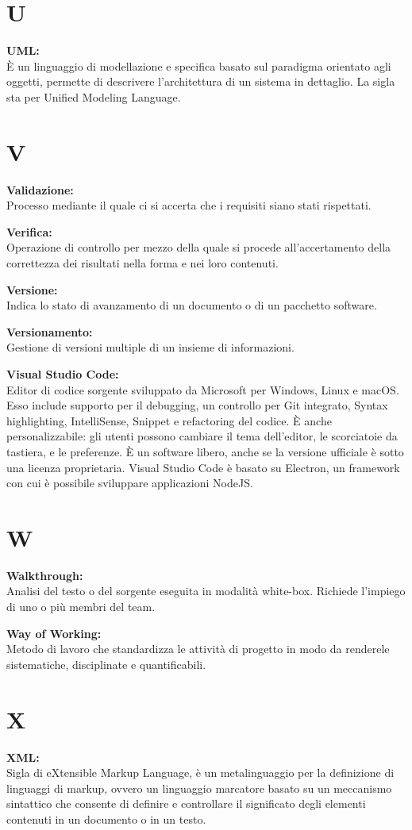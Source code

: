 \documentclass[a4paper, oneside, openany, dvipsnames, table]{article}
\begin{document}
\newpage 
\section{U}

\textbf{UML:}\\ \`E un linguaggio di modellazione e specifica basato sul paradigma orientato agli oggetti, permette di descrivere l'architettura di un sistema in dettaglio. La sigla sta per Unified Modeling Language.

\newpage
\section{V}
\textbf{Validazione:}\\	Processo mediante il quale ci si accerta che i requisiti siano stati rispettati.

\textbf{Verifica:}\\	Operazione di controllo per mezzo della quale si procede all'accertamento della correttezza dei risultati nella forma e nei loro contenuti.

\textbf{Versione:}\\ Indica lo stato di avanzamento di un documento o di un pacchetto software.

\textbf{Versionamento:}\\	Gestione di versioni multiple di un insieme di informazioni.

\textbf{Visual Studio Code:}\\	Editor di codice sorgente sviluppato da Microsoft per Windows, Linux e macOS. Esso include supporto per il debugging, un controllo per Git integrato, Syntax highlighting, IntelliSense, Snippet e refactoring del codice. È anche personalizzabile: gli utenti possono cambiare il tema dell'editor,  le scorciatoie da tastiera, e le preferenze. È un software libero, anche se la versione ufficiale è sotto una licenza proprietaria. Visual Studio Code è basato su Electron, un framework con cui è possibile sviluppare applicazioni NodeJS.


\newpage
\section{W}
\textbf{Walkthrough:}\\
Analisi del testo o del sorgente eseguita in modalità white-box. Richiede l'impiego di uno o più membri del team.

\textbf{Way of Working:}\\
Metodo di lavoro che standardizza le attività di progetto in modo da renderele sistematiche, disciplinate
e quantificabili.

\newpage
\section{X}
\textbf{XML:}\\
Sigla di eXtensible Markup Language, è un metalinguaggio per la definizione di linguaggi di markup, ovvero un linguaggio marcatore basato su un meccanismo sintattico che consente di definire e controllare il significato degli elementi contenuti in un documento o in un testo.
\end{document}
